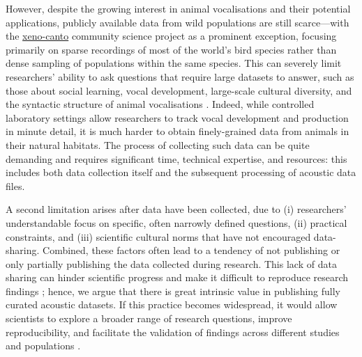 However, despite the growing interest in animal vocalisations and their potential applications, publicly available data from wild populations are still scarce---with the \href{https://xeno-canto.org/}{xeno-canto} community science project as a prominent exception, focusing primarily on sparse recordings of most of the world's bird species rather than dense sampling of populations within the same species. This can severely limit researchers' ability to ask questions that require large datasets to answer, such as those about social learning, vocal development, large-scale cultural diversity, and the syntactic structure of animal vocalisations \parencite{aplin2019, kollmorgen2020, lachlan2018, sainburg2019}. Indeed, while controlled laboratory settings allow researchers to track vocal development and production in minute detail, it is much harder to obtain finely-grained data from animals in their natural habitats. The process of collecting such data can be quite demanding and requires significant time, technical expertise, and resources: this includes both data collection itself and the subsequent processing of acoustic data files.

A second limitation arises after data have been collected, due to (i) researchers' understandable focus on specific, often narrowly defined questions, (ii) practical constraints, and (iii) scientific cultural norms that have not encouraged data-sharing. Combined, these factors often lead to a tendency of not publishing or only partially publishing the data collected during research. This lack of data sharing can hinder scientific progress and make it difficult to reproduce research findings \parencite{jenkins2023, powers2019, reichman2011, wilkinson2016}; hence, we argue that there is great intrinsic value in publishing fully curated acoustic datasets. If this practice becomes widespread, it would allow scientists to explore a broader range of research questions, improve reproducibility, and facilitate the validation of findings across different studies and populations \parencite{hersh2023, powers2019}.

